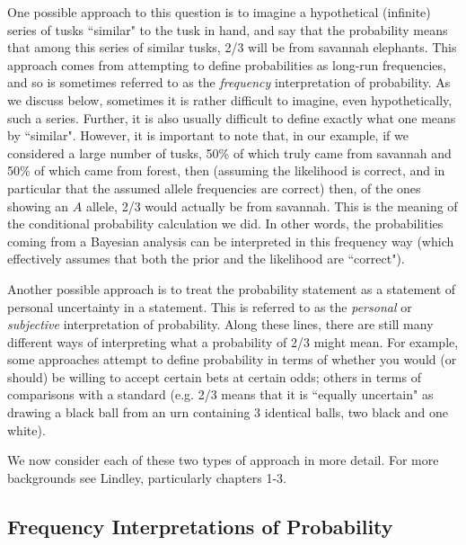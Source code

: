 \documentclass{article}[11pt]
\begin{document}
One possible approach to this question is to imagine a hypothetical (infinite) series of tusks ``similar" to the tusk in hand, and say that the probability means that among this series of similar tusks, 2/3 will be from savannah elephants. This approach comes from attempting to define probabilities as long-run frequencies, and so is sometimes referred to as the {\it frequency} interpretation of probability.
As we discuss below, sometimes it is rather difficult to imagine, even hypothetically, such a series. 
Further, it is also usually difficult to define exactly what one means by ``similar". However, it is important to note that, in our example, if
we considered a large number of tusks, 50\% of which truly came from savannah  and 50\% of which came from forest, then (assuming the likelihood is correct, and in particular that the assumed allele frequencies are correct) then, of the ones showing an $A$ allele, 2/3 would actually be from savannah. This is the meaning of
the conditional probability calculation we did.
In other words, the probabilities coming from a Bayesian analysis
can be interpreted in this frequency way (which effectively assumes that both the prior and the likelihood are ``correct").

Another possible approach is to treat the probability statement
as a statement of personal uncertainty in a statement. This is referred to as
the {\it personal} or {\it subjective} interpretation of probability. 
Along these lines, there are still many different ways of interpreting what a probability of 2/3 might mean.
For example, some approaches attempt to define probability in terms of whether you would (or should) be willing to accept certain bets at certain odds; others in terms
of comparisons with a standard (e.g. 2/3 means that it is ``equally uncertain" as drawing a black ball from an urn containing 3 identical balls, two black and one white). 

We now consider each of these two types of approach in more detail. For more backgrounds
see Lindley, particularly chapters 1-3.



\subsection{Frequency Interpretations of Probability}
\end{document}
